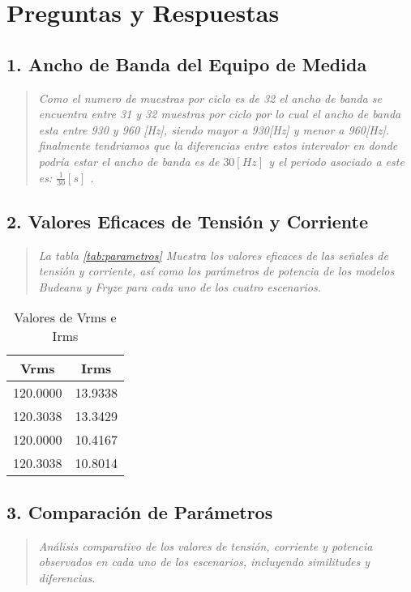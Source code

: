 \documentclass[conference]{IEEEtran}
\theoremstyle{mytheoremstyle}
\theoremstyle{mytheoremstyle}
\theoremstyle{myproblemstyle}
\begin{document}
        \section{Preguntas y Respuestas}

        \subsection{1. Ancho de Banda del Equipo de Medida}
        \begin{quote}
        \textit{Como el numero de muestras por ciclo es de 32 el ancho de banda se encuentra entre 31 y 32 muestras por ciclo por lo cual el ancho de banda esta entre 930 y 960 [Hz], siendo mayor a 930[Hz] y menor a 960[Hz]. finalmente tendriamos que la diferencias entre estos intervalor en donde podría estar el ancho de banda es de $30 [Hz]$ y el periodo asociado a este es: $\frac{1}{30} [s]$ .}
        \end{quote}

        \subsection{2. Valores Eficaces de Tensión y Corriente}
        \begin{quote}
        \textit{La tabla \ref{tab:parametros} Muestra los valores eficaces de las señales de tensión y corriente, así como los parámetros de potencia de los modelos Budeanu y Fryze para cada uno de los cuatro escenarios.}
        \end{quote}

        \begin{table}[h!]
            \centering
            \caption{Valores de Vrms e Irms}
            \begin{tabular}{cc}
            \toprule
            \textbf{Vrms} & \textbf{Irms} \\
            \midrule
            120.0000 & 13.9338 \\
            120.3038 & 13.3429 \\
            120.0000 & 10.4167 \\
            120.3038 & 10.8014 \\
            \bottomrule
            \end{tabular}
            \end{table}

        \subsection{3. Comparación de Parámetros}
        \begin{quote}
        \textit{Análisis comparativo de los valores de tensión, corriente y potencia observados en cada uno de los escenarios, incluyendo similitudes y diferencias.}
        \end{quote}
\end{document}

